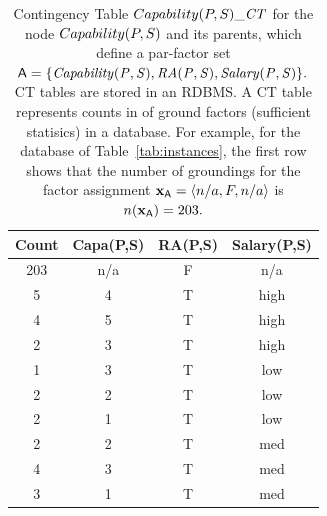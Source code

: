 \begin{table}[htbp]
  \centering
  \caption{Contingency Table $Capability(\P,\S)\_\cttable$ for the node $Capability(\P,\S)$ and its parents, which define a par-factor set $\parrvs = \{\it{Capability}(\P,\S),\it{RA}(\P,\S),\it{Salary}(\P,\S)\}.$ CT tables are stored in an RDBMS. A CT table represents counts in of ground factors (sufficient statisics) in a database. For example, for the database of Table~\ref{tab:instances}, the first row shows that the number of groundings for 
 the factor assignment $\set{x}_{\parrvs} = \langle n/a, F, n/a \rangle$ is $n(\set{x}_{\parrvs})= 203.$}
  
    \begin{tabular}{|c|c|c|c|} \hline
    \textbf{Count} & \textbf{Capa(P,S)} & \textbf{RA(P,S)} & \textbf{Salary(P,S) } \\ \hline
    203   & n/a   & F     & n/a \\ \hline
    5     & 4     & T     & high \\ \hline
    4     & 5     & T     & high \\ \hline
    2     & 3     & T     & high \\ \hline
    1     & 3     & T     & low \\ \hline
    2     & 2     & T     & low \\\hline
    2     & 1     & T     & low \\ \hline
    2     & 2     & T     & med \\ \hline
    4     & 3     & T     & med \\ \hline
    3     & 1     & T     & med \\ \hline
    \end{tabular}%
  \label{tab:pbn-ct}%
\end{table}%



